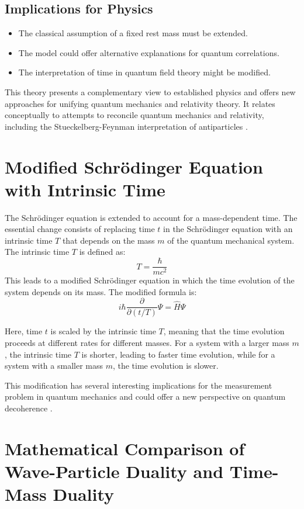 \documentclass[a4paper,12pt]{article}
\begin{document}
	\subsection{Implications for Physics}
	\begin{itemize}[leftmargin=*,nosep]
		\item The classical assumption of a fixed rest mass must be extended.
		\item The model could offer alternative explanations for quantum correlations.
		\item The interpretation of time in quantum field theory might be modified.
	\end{itemize}
	
	This theory presents a complementary view to established physics and offers new approaches for unifying quantum mechanics and relativity theory. It relates conceptually to attempts to reconcile quantum mechanics and relativity, including the Stueckelberg-Feynman interpretation of antiparticles \cite{Stueckelberg1941, Feynman1949}.
	
	\section{Modified Schrödinger Equation with Intrinsic Time}
	The Schrödinger equation is extended to account for a mass-dependent time. The essential change consists of replacing time $t$ in the Schrödinger equation with an intrinsic time $T$ that depends on the mass $m$ of the quantum mechanical system. The intrinsic time $T$ is defined as:
	\[
	T = \frac{\hbar}{m c^2}
	\]
	This leads to a modified Schrödinger equation in which the time evolution of the system depends on its mass. The modified formula is:
	\[
	i\hbar \frac{\partial}{\partial (t/T)} \Psi = \hat{H} \Psi
	\]
	
	Here, time $t$ is scaled by the intrinsic time $T$, meaning that the time evolution proceeds at different rates for different masses. For a system with a larger mass $m$, the intrinsic time $T$ is shorter, leading to faster time evolution, while for a system with a smaller mass $m$, the time evolution is slower.
	
	This modification has several interesting implications for the measurement problem in quantum mechanics \cite{Schlosshauer2005} and could offer a new perspective on quantum decoherence \cite{Zurek2003}.
	
	\section{Mathematical Comparison of Wave-Particle Duality and Time-Mass Duality}
	
\end{document}
